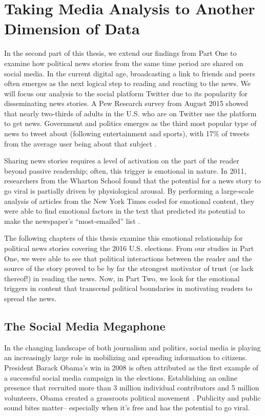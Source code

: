 \chapter{Taking Media Analysis to Another Dimension of Data}
In the second part of this thesis, we extend our findings from Part One to examine how political news stories from the same time period are shared on social media. In the current digital age, broadcasting a link to friends and peers often emerges as the next logical step to reading and reacting to the news. We will focus our analysis to the social platform Twitter due to its popularity for disseminating news stories. A Pew Research survey from August 2015 showed that nearly two-thirds of adults in the U.S. who are on Twitter use the platform to get news.  Government and politics emerges as the third most popular type of news to tweet about (following entertainment and sports), with 17\% of tweets from the average user being about that subject \cite{pew-Twitter-news}.

Sharing news stories requires a level of activation on the part of the reader beyond passive readership; often, this trigger is emotional in nature. In 2011, researchers from the Wharton School found that the potential for a news story to go viral is partially driven by physiological arousal. By performing a large-scale analysis of articles from the New York Times coded for emotional content, they were able to find emotional factors in the text that predicted its potential to make the newspaper’s “most-emailed” list \cite{berger2012makes}.

The following chapters of this thesis examine this emotional relationship for political news stories covering the 2016 U.S. elections. From our studies in Part One, we were able to see that political interactions between the reader and the source of the story proved to be by far the strongest motivator of trust (or lack thereof!) in reading the news. Now, in Part Two, we look for the emotional triggers in content that transcend political boundaries in motivating readers to spread the news.


\section{The Social Media Megaphone}
In the changing landscape of both journalism and politics, social media is playing an increasingly large role in mobilizing and spreading information to citizens. President Barack Obama’s win in 2008 is often attributed as the first example of a successful social media campaign in the elections. Establishing an online presence that recruited more than 3 million individual contributors and 5 million volunteers, Obama created a grassroots political movement \cite{cogburn2011networked}. Publicity and public sound bites matter-- especially when it’s free and has the potential to go viral.

